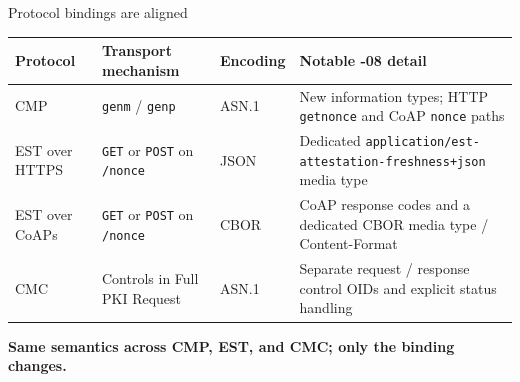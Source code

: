 \documentclass[aspectratio=169,10pt]{beamer}
\begin{document}
\begin{frame}{Protocol bindings are aligned}
  \small
  \begin{tabular}{@{}p{1.4cm}p{3.1cm}p{3.0cm}p{4.9cm}@{}}
    \toprule
    \textbf{Protocol} & \textbf{Transport mechanism} & \textbf{Encoding} & \textbf{Notable -08 detail}\\
    \midrule
    CMP &
      \texttt{genm} / \texttt{genp} &
      ASN.1 &
      New information types; HTTP \texttt{getnonce} and CoAP \texttt{nonce} paths\\[0.2cm]
    EST over HTTPS &
      \texttt{GET} or \texttt{POST} on \texttt{/nonce} &
      JSON &
      Dedicated \texttt{application/est-}\newline
      \texttt{attestation-freshness+json} media type\\[0.2cm]
    EST over CoAPs &
      \texttt{GET} or \texttt{POST} on \texttt{/nonce} &
      CBOR &
      CoAP response codes and a dedicated CBOR media type / Content-Format\\[0.2cm]
    CMC &
      Controls in Full PKI Request &
      ASN.1 &
      Separate request / response control OIDs and explicit status handling\\
    \bottomrule
  \end{tabular}

  \vspace{0.35cm}
  \begin{center}
    \alert{\bfseries Same semantics across CMP, EST, and CMC; only the binding changes.}
  \end{center}
\end{frame}
\end{document}
